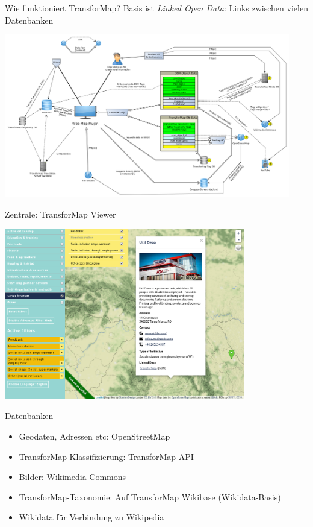 \documentclass{beamer}
\begin{document}
\begin{frame}{Wie funktioniert TransforMap?}
  Basis ist \emph{Linked Open Data}: Links zwischen vielen Datenbanken 

 \hspace*{-1cm}  \includegraphics[width=12.5cm]{website-dataflow-overview.png}


\end{frame}

\begin{frame}{Zentrale: TransforMap Viewer}

   \includegraphics[width=10.5cm]{viewer.png}

\end{frame}

\begin{frame}{Datenbanken}

\begin{itemize}
  \item Geodaten, Adressen etc: OpenStreetMap
  \item TransforMap-Klassifizierung: TransforMap API
  \item Bilder: Wikimedia Commons
    \pause
  \item TransforMap-Taxonomie: Auf TransforMap Wikibase (Wikidata-Basis)
  \item Wikidata für Verbindung zu Wikipedia

\end{itemize}

\end{frame}
\end{document}
